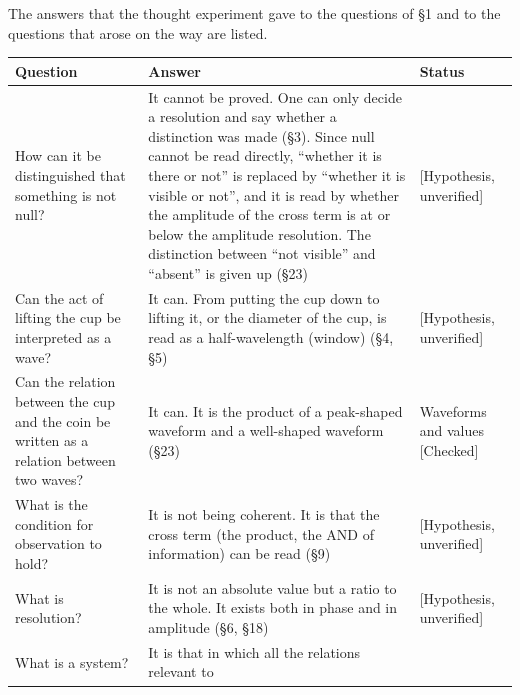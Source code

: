 \documentclass[
  a4paper,
]{article}
\newcounter{none} %
\begin{document}
The answers that the thought experiment gave to the questions of §1 and
to the questions that arose on the way are listed.

{\def\LTcaptype{none} %
\begin{longtable}[]{@{}
  >{\raggedright\arraybackslash}p{}
  >{\raggedright\arraybackslash}p{}
  >{\raggedright\arraybackslash}p{}@{}}
\toprule\noalign{}
\begin{minipage}[b]{\linewidth}\raggedright
Question
\end{minipage} & \begin{minipage}[b]{\linewidth}\raggedright
Answer
\end{minipage} & \begin{minipage}[b]{\linewidth}\raggedright
Status
\end{minipage} \\
\midrule\noalign{}
\endhead
\bottomrule\noalign{}
\endlastfoot
How can it be distinguished that something is not null? & It cannot be
proved. One can only decide a resolution and say whether a distinction
was made (§3). Since null cannot be read directly, ``whether it is there
or not'' is replaced by ``whether it is visible or not'', and it is read
by whether the amplitude of the cross term is at or below the amplitude
resolution. The distinction between ``not visible'' and ``absent'' is
given up (§23) & {[}Hypothesis, unverified{]} \\
Can the act of lifting the cup be interpreted as a wave? & It can. From
putting the cup down to lifting it, or the diameter of the cup, is read
as a half-wavelength (window) (§4, §5) & {[}Hypothesis, unverified{]} \\
Can the relation between the cup and the coin be written as a relation
between two waves? & It can. It is the product of a peak-shaped waveform
and a well-shaped waveform (§23) & Waveforms and values {[}Checked{]} \\
What is the condition for observation to hold? & It is not being
coherent. It is that the cross term (the product, the AND of
information) can be read (§9) & {[}Hypothesis, unverified{]} \\
What is resolution? & It is not an absolute value but a ratio to the
whole. It exists both in phase and in amplitude (§6, §18) &
{[}Hypothesis, unverified{]} \\
What is a system? & It is that in which all the relations relevant to

\end{longtable}}
\end{document}
